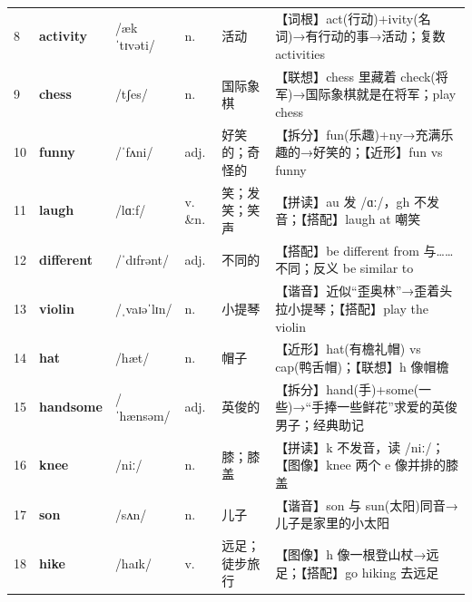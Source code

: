 \documentclass[UTF8,a4paper,11pt,oneside]{ctexbook}
\newcommand{\cellword}[1]{{\bfseries\textcolor{wordcol}{#1}}}
\newcommand{\cellipa}[1]{{\footnotesize\textcolor{ipacol}{#1}}}
\newcommand{\cellpos}[1]{\textcolor{poscol}{#1}}
\newcommand{\cellno}[1]{\textcolor{volcolor!75!black}{#1}}
\begin{document}
{\begin{longtable}{@{}C{0.045\textwidth}L{0.155\textwidth}L{0.175\textwidth}C{0.070\textwidth}L{0.180\textwidth}L{0.282\textwidth}@{}}
\cellno{8} & \cellword{activity} & \cellipa{/ækˈtɪvəti/} & \cellpos{n.} & 活动 & \textcolor{tagRoot}{【词根】}act(行动)+ivity(名词)→\allowbreak{}有行动的事→\allowbreak{}活动；复数 activities \\
 \cellno{9} & \cellword{chess} & \cellipa{/tʃes/} & \cellpos{n.} & 国际象棋 & \textcolor{tagAssoc}{【联想】}chess 里藏着 check(将军)→\allowbreak{}国际象棋就是在将军；play chess \\
\cellno{10} & \cellword{funny} & \cellipa{/ˈfʌni/} & \cellpos{adj.} & 好笑的；奇怪的 & \textcolor{tagSplit}{【拆分】}fun(乐趣)+ny→\allowbreak{}充满乐趣的→\allowbreak{}好笑的；\textcolor{tagNear}{【近形】}fun vs funny \\
 \cellno{11} & \cellword{laugh} & \cellipa{/lɑːf/} & \cellpos{v. \&n.} & 笑；发笑；笑声 & \textcolor{tagSpell}{【拼读】}au 发 /ɑː/，gh 不发音；\textcolor{tagColloc}{【搭配】}laugh at 嘲笑 \\
\cellno{12} & \cellword{different} & \cellipa{/ˈdɪfrənt/} & \cellpos{adj.} & 不同的 & \textcolor{tagColloc}{【搭配】}be different from 与……不同；反义 be similar to \\
 \cellno{13} & \cellword{violin} & \cellipa{/ˌvaɪəˈlɪn/} & \cellpos{n.} & 小提琴 & \textcolor{tagSound}{【谐音】}近似“歪奥林”→\allowbreak{}歪着头拉小提琴；\textcolor{tagColloc}{【搭配】}play the violin \\
\cellno{14} & \cellword{hat} & \cellipa{/hæt/} & \cellpos{n.} & 帽子 & \textcolor{tagNear}{【近形】}hat(有檐礼帽) vs cap(鸭舌帽)；\textcolor{tagAssoc}{【联想】}h 像帽檐 \\
 \cellno{15} & \cellword{handsome} & \cellipa{/ˈhænsəm/} & \cellpos{adj.} & 英俊的 & \textcolor{tagSplit}{【拆分】}hand(手)+some(一些)→\allowbreak{}“手捧一些鲜花”求爱的英俊男子；经典助记 \\
\cellno{16} & \cellword{knee} & \cellipa{/niː/} & \cellpos{n.} & 膝；膝盖 & \textcolor{tagSpell}{【拼读】}k 不发音，读 /niː/；\textcolor{tagImage}{【图像】}knee 两个 e 像并排的膝盖 \\
 \cellno{17} & \cellword{son} & \cellipa{/sʌn/} & \cellpos{n.} & 儿子 & \textcolor{tagSound}{【谐音】}son 与 sun(太阳)同音→\allowbreak{}儿子是家里的小太阳 \\
\cellno{18} & \cellword{hike} & \cellipa{/haɪk/} & \cellpos{v.} & 远足；徒步旅行 & \textcolor{tagImage}{【图像】}h 像一根登山杖→\allowbreak{}远足；\textcolor{tagColloc}{【搭配】}go hiking 去远足 \\
\end{longtable}
}
\end{document}
